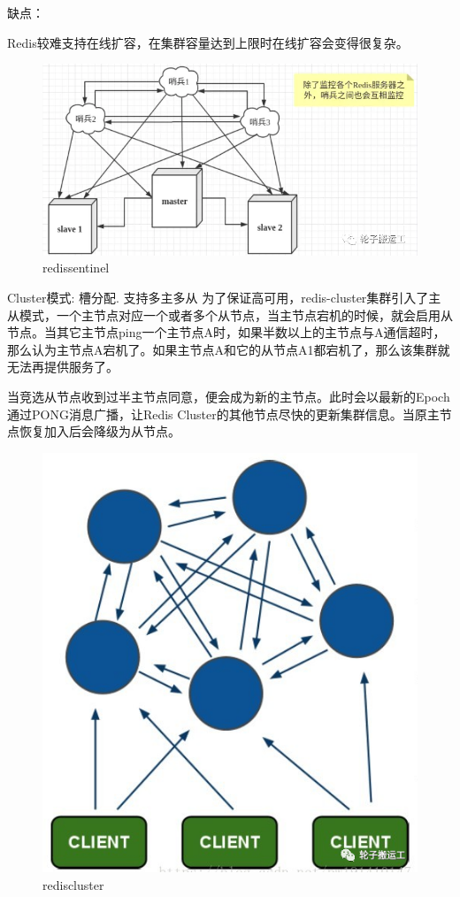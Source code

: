 \documentclass[UTF8]{ctexart}
\begin{document}
缺点：

Redis较难支持在线扩容，在集群容量达到上限时在线扩容会变得很复杂。
\begin{figure}
	\centering
	\includegraphics[width=0.7\linewidth]{figures/redis_sentinel.png}
	\caption{redissentinel}
	\label{fig:redissentinel}
\end{figure}

Cluster模式: 槽分配. 支持多主多从
为了保证高可用，redis-cluster集群引入了主从模式，一个主节点对应一个或者多个从节点，当主节点宕机的时候，就会启用从节点。当其它主节点ping一个主节点A时，如果半数以上的主节点与A通信超时，那么认为主节点A宕机了。如果主节点A和它的从节点A1都宕机了，那么该集群就无法再提供服务了。

当竞选从节点收到过半主节点同意，便会成为新的主节点。此时会以最新的Epoch通过PONG消息广播，让Redis Cluster的其他节点尽快的更新集群信息。当原主节点恢复加入后会降级为从节点。

\begin{figure}
	\centering
	\includegraphics[width=0.7\linewidth]{figures/redis_cluster.png}
	\caption{rediscluster}
	\label{fig:rediscluster}
\end{figure}
\end{document}
